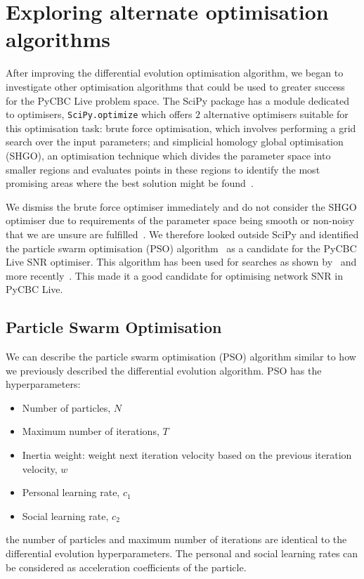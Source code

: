 \section{\label{7:sec:exploring_alt_opts}Exploring alternate optimisation algorithms}

After improving the differential evolution optimisation algorithm, we began to investigate other optimisation algorithms that could be used to greater success for the PyCBC Live problem space. The SciPy package has a module dedicated to optimisers, \texttt{SciPy.optimize} which offers $2$ alternative optimisers suitable for this optimisation task: brute force optimisation, which involves performing a grid search over the input parameters; and simplicial homology global optimisation (SHGO), an optimisation technique which divides the parameter space into smaller regions and evaluates points in these regions to identify the most promising areas where the best solution might be found~\cite{shgo:2018}.

We dismiss the brute force optimiser immediately and do not consider the SHGO optimiser due to requirements of the parameter space being smooth or non-noisy that we are unsure are fulfilled~\cite{shgo:2018}. We therefore looked outside SciPy and identified the particle swarm optimisation (PSO) algorithm~\cite{pso:1995} as a candidate for the PyCBC Live SNR optimiser. This algorithm has been used for \gwadj searches as shown by~\cite{pso_search_1:2018} and more recently~\cite{pso_search_2:2023}. This made it a good candidate for optimising network SNR in PyCBC Live.

\subsection{\label{7:sec:pso}Particle Swarm Optimisation}

We can describe the particle swarm optimisation (PSO) algorithm similar to how we previously described the differential evolution algorithm. PSO has the hyperparameters:
%
\begin{itemize}
    \item Number of particles, $N$
    \item Maximum number of iterations, $T$
    \item Inertia weight: weight next iteration velocity based on the previous iteration velocity, $w$
    \item Personal learning rate, $c_{1}$
    \item Social learning rate, $c_{2}$
\end{itemize}
%
the number of particles and maximum number of iterations are identical to the differential evolution hyperparameters. The personal and social learning rates can be considered as acceleration coefficients of the particle.

